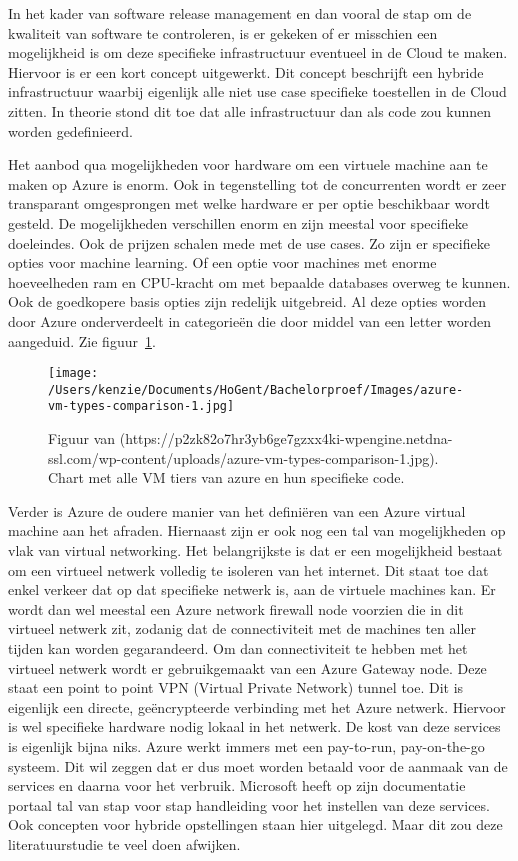 In het kader van software release management en dan vooral de stap om de kwaliteit van software te controleren, is er gekeken of er misschien een mogelijkheid is om deze specifieke infrastructuur eventueel in de Cloud te maken. Hiervoor is er een kort concept uitgewerkt. Dit concept beschrijft een hybride infrastructuur waarbij eigenlijk alle niet use case specifieke toestellen in de Cloud zitten. In theorie stond dit toe dat alle infrastructuur dan als code zou kunnen worden gedefinieerd.

Het aanbod qua mogelijkheden voor hardware om een virtuele machine aan te maken op Azure is enorm. Ook in tegenstelling tot de concurrenten wordt er zeer transparant omgesprongen met welke hardware er per optie beschikbaar wordt gesteld. De mogelijkheden verschillen enorm en zijn meestal voor specifieke doeleindes. Ook de prijzen schalen mede met de use cases. Zo zijn er specifieke opties voor machine learning. Of een optie voor machines met enorme hoeveelheden ram en CPU-kracht om met bepaalde databases overweg te kunnen. Ook de goedkopere basis opties zijn redelijk uitgebreid. Al deze opties worden door Azure onderverdeelt in categorieën die door middel van een letter worden aangeduid. Zie figuur~\ref{fig:Chart_Azure_tiers}.
\begin{figure}[!htbp]
    \centering
    \texttt{[image: /Users/kenzie/Documents/HoGent/Bachelorproef/Images/azure-vm-types-comparison-1.jpg]}
    \caption{Figuur van (https://p2zk82o7hr3yb6ge7gzxx4ki-wpengine.netdna-ssl.com/wp-content/uploads/azure-vm-types-comparison-1.jpg). Chart met alle VM tiers van azure en hun specifieke code.}
    \label{fig:Chart_Azure_tiers}
\end{figure}
Verder is Azure de oudere manier van het definiëren van een Azure virtual machine aan het afraden. Hiernaast zijn er ook nog een tal van mogelijkheden op vlak van virtual networking. Het belangrijkste is dat er een mogelijkheid bestaat om een virtueel netwerk volledig te isoleren van het internet. Dit staat toe dat enkel verkeer dat op dat specifieke netwerk is, aan de virtuele machines kan. Er wordt dan wel meestal een Azure network firewall node voorzien die in dit virtueel netwerk zit, zodanig dat de connectiviteit met de machines ten aller tijden kan worden gegarandeerd. Om dan connectiviteit te hebben met het virtueel netwerk wordt er gebruikgemaakt van een Azure Gateway node. Deze staat een point to point VPN (Virtual Private Network) tunnel toe. Dit is eigenlijk een directe, geëncrypteerde verbinding met het Azure netwerk. Hiervoor is wel specifieke hardware nodig lokaal in het netwerk. De kost van deze services is eigenlijk bijna niks. Azure werkt immers met een pay-to-run, pay-on-the-go systeem. Dit wil zeggen dat er dus moet worden betaald voor de aanmaak van de services en daarna voor het verbruik. Microsoft heeft op zijn documentatie portaal tal van stap voor stap handleiding voor het instellen van deze services. Ook concepten voor hybride opstellingen staan hier uitgelegd. Maar dit zou deze literatuurstudie te veel doen afwijken.

